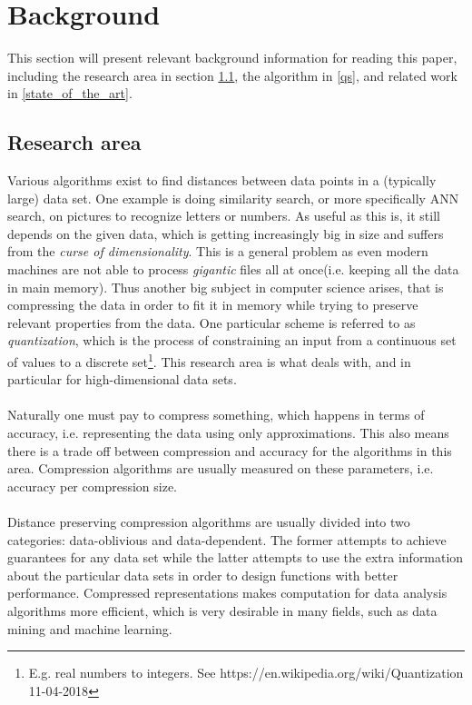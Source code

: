 \section{Background}
\label{background}
This section will present relevant background information for reading this paper, including the research area in section \ref{research_area}, the \qs{} algorithm in \ref{qs}, and related work in \ref{state_of_the_art}.

\subsection{Research area}
\label{research_area}
Various algorithms exist to find distances between data points in a (typically large) data set. One example is doing similarity search, or more specifically ANN search, on pictures to recognize letters or numbers. As useful as this is, it still depends on the given data, which is getting increasingly big in size and suffers from the \textit{curse of dimensionality}. This is a general problem as even modern machines are not able to process \textit{gigantic} files all at once(i.e. keeping all the data in main memory). Thus another big subject in computer science arises, that is compressing the data in order to fit it in memory while trying to preserve relevant properties from the data. One particular scheme is referred to as \textit{quantization}, which is the process of constraining an input from a continuous set of values to a discrete set\footnote{E.g. real numbers to integers. See https://en.wikipedia.org/wiki/Quantization 11-04-2018}. This research area is what \qs{} deals with, and in particular for high-dimensional data sets. 
\\
\\
Naturally one must pay to compress something, which happens in terms of accuracy, i.e. representing the data using only approximations. This also means there is a trade off between compression and accuracy for the algorithms in this area. Compression algorithms are usually measured on these parameters, i.e. accuracy per compression size\cite{wagner17,schmid9}.
\\
\\
Distance preserving compression algorithms are usually divided into two categories: data-oblivious and data-dependent. The former attempts to achieve guarantees for any data set while the latter attempts to use the extra information about the particular data sets in order to design functions with better performance. Compressed representations makes computation for data analysis algorithms more efficient, which is very desirable in many fields, such as data mining and machine learning\cite{stan15}.

